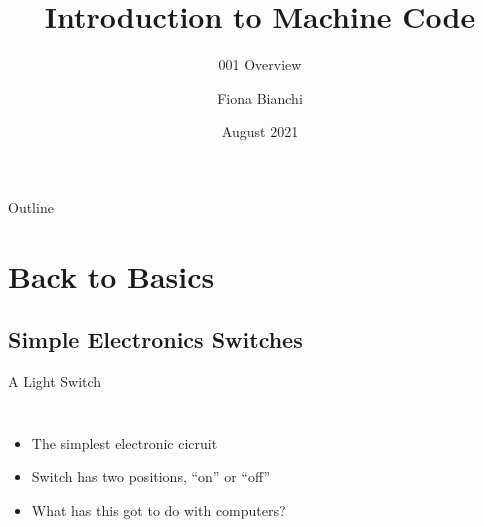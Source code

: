 \documentclass{beamer}
\title{Introduction to Machine Code}
\subtitle{001 Overview}
\author{Fiona Bianchi}
\institute{HiKlas Ltd}
\date{August 2021}
\begin{document}
\begin{frame}
  \titlepage
\end{frame}

\begin{frame}{Outline}
  \tableofcontents
\end{frame}


\section{Back to Basics}

\subsection[Switches]{Simple Electronics Switches}

\begin{frame}{A Light Switch}

  \begin{columns}
    \begin{itemize}
    \item
      The simplest electronic cicruit
    \item
      Switch has two positions, ``on'' or ``off''
    \item
      What has this got to do with computers?
    \end{itemize}

  \end{columns}
\end{frame}
\end{document}

